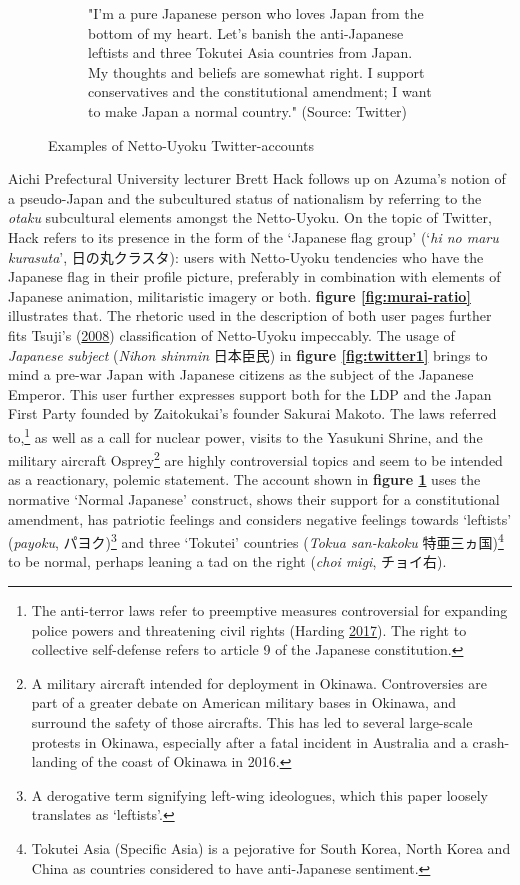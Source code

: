 \documentclass[10pt,british,A4paper,twoside]{memoir}
\begin{document}
\begin{figure}[!htb]
\begin{subfigure}[b]{0.40\textwidth}
 \caption{"I’m a pure Japanese person who loves Japan from the bottom of my heart. Let’s banish the anti-Japanese leftists and three Tokutei Asia countries from Japan. My thoughts and beliefs are somewhat right. I support conservatives and the constitutional amendment; I want to make Japan a normal country." (Source: Twitter)}
 \label{fig:twitter2}
 \end{subfigure}
 \caption{Examples of Netto-Uyoku Twitter-accounts}\label{fig:twitter}
\end{figure}

Aichi Prefectural University lecturer Brett Hack follows up on Azuma's
notion of a pseudo-Japan and the subcultured status of nationalism by
referring to the \emph{otaku} subcultural elements amongst the
Netto-Uyoku. On the topic of Twitter, Hack refers to its presence in the
form of the `Japanese flag group' (`\emph{hi no maru kurasuta}',
日の丸クラスタ): users with Netto-Uyoku tendencies who have the Japanese
flag in their profile picture, preferably in combination with elements
of Japanese animation, militaristic imagery or both. \textbf{figure
\ref{fig:murai-ratio}} illustrates that. The rhetoric used in the
description of both user pages further fits Tsuji's
(\protect\hyperlink{ref-tsuji_eng:_2008}{2008}) classification of
Netto-Uyoku impeccably. The usage of \emph{Japanese subject}
(\emph{Nihon shinmin} 日本臣民) in \textbf{figure \ref{fig:twitter1}}
brings to mind a pre-war Japan with Japanese citizens as the subject of
the Japanese Emperor. This user further expresses support both for the
LDP and the Japan First Party founded by Zaitokukai's founder Sakurai
Makoto. The laws referred to,\footnote{The anti-terror laws refer to
  preemptive measures controversial for expanding police powers and
  threatening civil rights (Harding
  \protect\hyperlink{ref-harding_japan_2017}{2017}). The right to
  collective self-defense refers to article 9 of the Japanese
  constitution.} as well as a call for nuclear power, visits to the
Yasukuni Shrine, and the military aircraft Osprey\footnote{A military
  aircraft intended for deployment in Okinawa. Controversies are part of
  a greater debate on American military bases in Okinawa, and surround
  the safety of those aircrafts. This has led to several large-scale
  protests in Okinawa, especially after a fatal incident in Australia
  and a crash-landing of the coast of Okinawa in 2016.} are highly
controversial topics and seem to be intended as a reactionary, polemic
statement. The account shown in \textbf{figure \ref{fig:twitter2}} uses
the normative `Normal Japanese' construct, shows their support for a
constitutional amendment, has patriotic feelings and considers negative
feelings towards `leftists' (\emph{payoku}, パヨク)\footnote{A
  derogative term signifying left-wing ideologues, which this paper
  loosely translates as `leftists'.} and three `Tokutei' countries
(\emph{Tokua san-kakoku} 特亜三ヵ国)\footnote{Tokutei Asia (Specific
  Asia) is a pejorative for South Korea, North Korea and China as
  countries considered to have anti-Japanese sentiment.} to be normal,
perhaps leaning a tad on the right (\emph{choi migi}, チョイ右).
\end{document}
